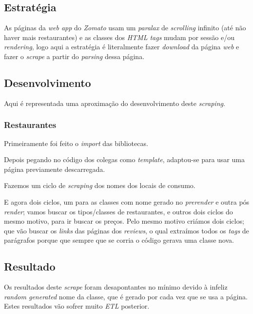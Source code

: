 \subsection{Estratégia}
As páginas da \textit{web app} do \textit{Zomato} usam um \textit{paralax} de \textit{scrolling} infinito (até não haver mais restaurantes) e as classes dos \textit{HTML tags} mudam por sessão e/ou \textit{rendering}, logo aqui a estratégia é literalmente fazer \textit{download} da página \textit{web} e fazer o \textit{scrape} a partir do \textit{parsing} dessa página.

\subsection{Desenvolvimento}
Aqui é representada uma aproximação do desenvolvimento deste \textit{scraping}.
\subsubsection{Restaurantes}
Primeiramente foi feito o \textit{import} das bibliotecas.

Depois pegando no código dos colegas como \textit{template}, adaptou-se para usar uma página previamente descarregada.

Fazemos um ciclo de \textit{scraping} dos nomes dos locais de consumo.

E agora dois ciclos, um para as classes com nome gerado no \textit{prerender} e outra pós \textit{render}; vamos buscar os tipos/classes de restaurantes, e outros dois ciclos do mesmo motivo, para ir buscar os preços. Pelo mesmo motivo criámos dois ciclos; que vão buscar os \textit{links} das páginas dos \textit{reviews}, o qual extraímos todos os \textit{tags} de parágrafos porque que sempre que se corria o código gerava uma classe nova.

\subsection{Resultado}
Os resultados deste \textit{scrape} foram desapontantes no mínimo devido à infeliz \textit{random generated} nome da classe, que é gerado por cada vez que se usa a página. Estes resultados vão sofrer muito \textit{ETL} posterior.